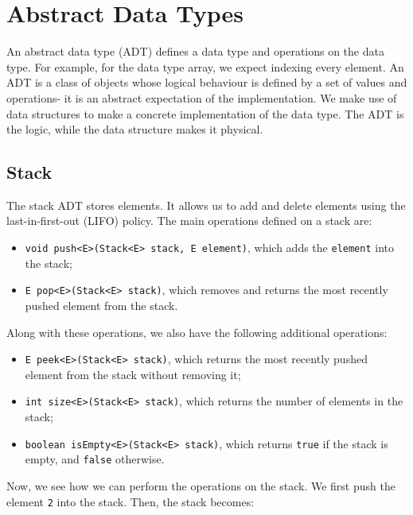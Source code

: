 \documentclass[a4paper, openany]{memoir}
\begin{document}
\section{Abstract Data Types}
An abstract data type (ADT) defines a data type and operations on the data type. For example, for the data type array, we expect indexing every element. An ADT is a class of objects whose logical behaviour is defined by a set of values and operations- it is an abstract expectation of the implementation. We make use of data structures to make a concrete implementation of the data type. The ADT is the logic, while the data structure makes it physical.

\subsection{Stack}
The stack ADT stores elements. It allows us to add and delete elements using the last-in-first-out (LIFO) policy. The main operations defined on a stack are:
\begin{itemize}
    \item \texttt{void push<E>(Stack<E> stack, E element)}, which adds the \texttt{element} into the stack;
    \item \texttt{E pop<E>(Stack<E> stack)}, which removes and returns the most recently pushed element from the stack.
\end{itemize}
Along with these operations, we also have the following additional operations:
\begin{itemize}
    \item \texttt{E peek<E>(Stack<E> stack)}, which returns the most recently pushed element from the stack without removing it;
    \item \texttt{int size<E>(Stack<E> stack)}, which returns the number of elements in the stack;
    \item \texttt{boolean isEmpty<E>(Stack<E> stack)}, which returns \texttt{true} if the stack is empty, and \texttt{false} otherwise.
\end{itemize}
Now, we see how we can perform the operations on the stack. We first push the element \texttt{2} into the stack. Then, the stack becomes:
\begin{center}
\end{center}
\end{document}
